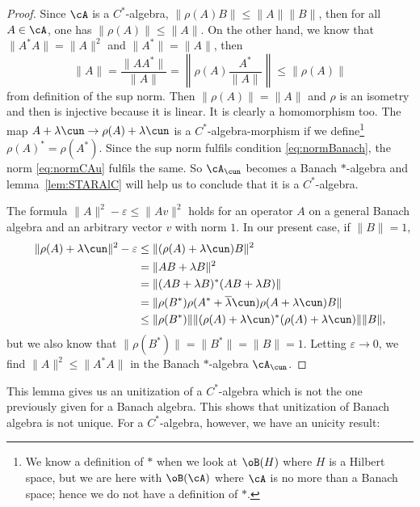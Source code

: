 \begin{proof}
	Since $\cA$ is a $C^*$-algebra, $\|\rho(A)B\|\leq\| A \|\|B\|$, then for all $A\in \cA$, one has $\| \rho(A) \|\leq \| A \|$. On the other hand, we know that $\| A^*A \|=\| A \|^2$ and $\| A^* \|=\| A \|$, then
	\[
		\| A \|=\frac{\| AA^* \|}{\| A \|}=\left\|  \rho(A)\frac{A^*}{\| A \|}  \right\|\leq\| \rho(A) \|
	\]
	from definition of the sup norm. Then $\| \rho(A) \|=\| A \|$ and $\rho$ is an isometry and then is injective because it is linear. It is clearly a homomorphism too. The map $A+\lambda\cun\to\rho(A)+\lambda\cun$ is a $C^*$-algebra-morphism if we define\footnote{We know a definition of $*$ when we look at $\oB(H)$ where $H$ is a Hilbert space, but we are here with $\oB(\cA)$ where $\cA$ is no more than a Banach space; hence we do not have a definition of $*$.} $\rho(A)^*=\rho(A^*)$.  Since the sup norm fulfils condition \eqref{eq:normBanach}, the norm \eqref{eq:normCAu} fulfils the same. So $\cA_{\cun}$ becomes a Banach $*$-algebra and lemma~\ref{lem:STARAlC} will help us to conclude that it is a $C^*$-algebra.

	The formula $\| A \|^2-\varepsilon\leq\| Av \|^2$ holds for an operator $A$ on a general Banach algebra and an arbitrary vector $v$ with norm $1$. In our present case, if $\| B \|=1$,
	\begin{equation}
		\begin{split}
			\| \rho(A)+\lambda\cun \|^2-\varepsilon
			&\leq \| (\rho(A)+\lambda\cun)B \|^2\\
			&    =\| AB+\lambda B \|^2\\
			&    =\| (AB+\lambda B)^*(AB+\lambda B) \|\\
			&    =\| \rho(B^*)\rho(A^*+\overline{\lambda}\cun)\rho(A+\lambda\cun)B \|\\
			&\leq \| \rho(B^*) \|\| (\rho(A)+\lambda\cun)^*(\rho(A)+\lambda\cun) \|\| B \|,
		\end{split}
	\end{equation}
	but we also know that $\| \rho(B^*) \|=\| B^* \|=\| B \|=1$. Letting $\varepsilon\to 0$, we find $\| A \|^2\leq\| A^*A \|$ in the Banach $*$-algebra $\cA_{\cun}$.

\end{proof}

\label{pg:unit_nonunic} This lemma gives us an unitization of a $C^*$-algebra which is not the one previously given for a Banach algebra. This shows that unitization of Banach algebra is not unique. For a $C^*$-algebra, however, we have an unicity result:


